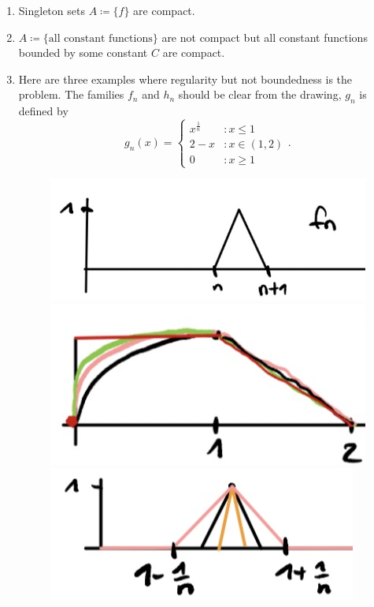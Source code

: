 \begin{example}
	\begin{enumerate}[label=(\roman*)]
		\item Singleton sets $A \coloneqq \{ f \}$ are compact.
		\item $A \coloneqq \{ \text{all constant functions}\}$ are not compact but all constant functions bounded by some constant $C$ are compact.
		\item Here are three examples where regularity but not boundedness is the problem. The families $f_n$ and $h_n$ should be clear from the drawing, $g_n$ is defined by
		$$g_n(x) = \begin{cases}
			x^{\frac{1}{n}} &: x \leq 1 \\
			2-x &: x\in (1,2) \\
			0 &: x\geq 1
		\end{cases}.$$
		\begin{figure}[h]
			\begin{center}
				\includegraphics[scale=0.2]{compact1.jpeg}
				\includegraphics[scale=0.2]{compact2.jpeg}
				\includegraphics[scale=0.2]{compact3.jpeg}

\end{center}
\end{figure}
\end{enumerate}
\end{example}
